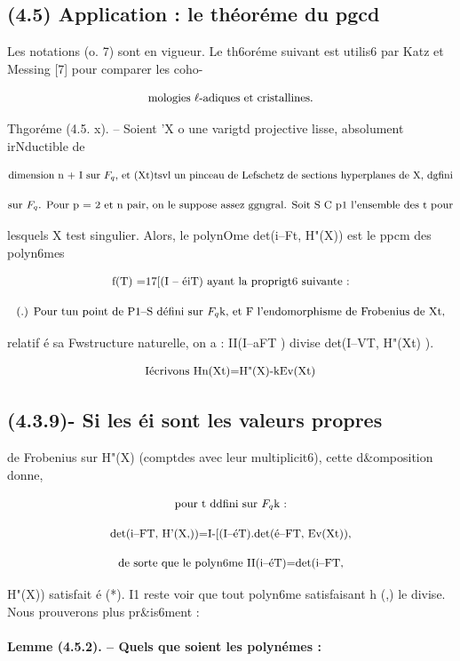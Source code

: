 \documentclass[11pt]{article}
\theoremstyle{remark}
\begin{document}
\subsection*{(4.5) Application : le théoréme du pgcd}

Les notations (o. 7) sont en vigueur. Le th6oréme suivant est utilis6 par Katz et Messing [7] pour comparer les coho-

\[\text{\small mologies \(\ell\)-adiques et cristallines.}\]

Thgoréme (4.5. x). -- Soient 'X o une varigtd projective lisse, absolument irNductible de

\[\text{\small dimension n + I sur \(F_q\), et (Xt)tsvl un pinceau de Lefschetz de sections hyperplanes de X, dgfini}\]

\[\text{\small sur \(F_q\). Pour p = 2 et n pair, on le suppose assez ggngral. Soit S C p1 l'ensemble des t pour}\]

lesquels X test singulier. Alors, le polynOme det(i--Ft, H"(X)) est le ppcm des polyn6mes

\[\text{\small f(T) =17[(I -- éiT) ayant la proprigt6 suivante :}\]

\[\text{\small (.) Pour tun point de P1--S défini sur \(F_q\)k, et F l'endomorphisme de Frobenius de Xt,}\]

relatif é sa Fwstructure naturelle, on a : II(I--aFT ) divise det(I--VT, H"(Xt) ).

\[\text{\small Iécrivons Hn(Xt)=H"(X)-kEv(Xt)}\]

\subsection*{(4.3.9)- Si les éi sont les valeurs propres}

de Frobenius sur H"(X) (comptdes avec leur multiplicit6), cette d\&omposition donne,

\[\text{\small pour t ddfini sur \(F_q\)k :}\]

\[\text{\small det(i--FT, H'(X,))=I-[(I--éT).det(é--FT, Ev(Xt)),}\]

\[\text{\small de sorte que le polyn6me II(i--éT)=det(i--FT,}\]

H"(X)) satisfait é (*). I1 reste voir que tout polyn6me satisfaisant h (,) le divise. Nous prouverons plus pr\&is6ment :

\paragraph{Lemme (4.5.2). -- Quels que soient les polynémes :}
\end{document}
